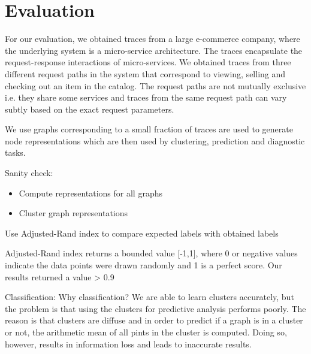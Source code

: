 \section{Evaluation}
 \newline
{} \newline

For our evaluation, we obtained traces from a large e-commerce company, where the underlying system is a micro-service architecture. The traces encapsulate the request-response interactions of micro-services. We obtained traces from three different request paths in the system that correspond to viewing, selling and checking out an item in the catalog. The request paths are not mutually exclusive i.e. they share some services and traces from the same request path can vary subtly based on the exact request parameters.

We use graphs corresponding to a small fraction of traces are used to generate node representations which are then used by clustering, prediction and diagnostic tasks. 

Sanity check: 
\begin{itemize}
\item Compute representations for all graphs
\item Cluster graph representations
\end{itemize}
Use Adjusted-Rand index to compare expected labels with obtained labels

Adjusted-Rand index returns a bounded value [-1,1], where 0 or negative values indicate the data points were drawn randomly and 1 is a perfect score. Our results returned a value > 0.9

Classification:
Why classification? 
We are able to learn clusters accurately, but the problem is that using the clusters for predictive analysis performs poorly. The reason is that clusters are diffuse and in order to predict if a graph is in a cluster or not, the arithmetic mean of all pints in the cluster is computed. Doing so, however, results in information loss and leads to inaccurate results.

